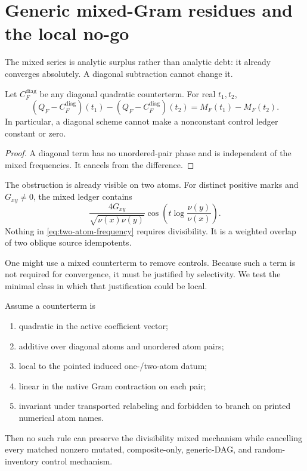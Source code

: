 \section{Generic mixed-Gram residues and the local no-go}
\label{sec:no-go}

The mixed series is analytic surplus rather than analytic debt: it already
converges absolutely.  A diagonal subtraction cannot change it.

\begin{theorem}
\label{thm:diagonal-invariance}
Let $C_F^{\mathrm{diag}}$ be any diagonal quadratic counterterm.  For real
$t_1,t_2$,
\begin{equation}
 (Q_F-C_F^{\mathrm{diag}})(t_1)
 -(Q_F-C_F^{\mathrm{diag}})(t_2)
 =M_F(t_1)-M_F(t_2).
 \label{eq:diagonal-invariance}
\end{equation}
In particular, a diagonal scheme cannot make a nonconstant control ledger
constant or zero.
\end{theorem}
\begin{proof}
A diagonal term has no unordered-pair phase and is independent of the mixed
frequencies.  It cancels from the difference.
\end{proof}

The obstruction is already visible on two atoms.  For distinct positive
marks and $G_{xy}\ne0$, the mixed ledger contains
\begin{equation}
 \frac{4G_{xy}}{\sqrt{\nu(x)\nu(y)}}
 \cos\!\left(t\log\frac{\nu(y)}{\nu(x)}\right).
 \label{eq:two-atom-frequency}
\end{equation}
Nothing in \eqref{eq:two-atom-frequency} requires divisibility.  It is a
weighted overlap of two oblique source idempotents.

One might use a mixed counterterm to remove controls.  Because such a term is
not required for convergence, it must be justified by selectivity.  We test
the minimal class in which that justification could be local.

\begin{theorem}
\label{thm:pair-local-no-go}
Assume a counterterm is
\begin{enumerate}
\item quadratic in the active coefficient vector;
\item additive over diagonal atoms and unordered atom pairs;
\item local to the pointed induced one-/two-atom datum;
\item linear in the native Gram contraction on each pair;
\item invariant under transported relabeling and forbidden to branch on
printed numerical atom names.
\end{enumerate}
Then no such rule can preserve the divisibility mixed mechanism while
cancelling every matched nonzero mutated, composite-only, generic-DAG, and
random-inventory control mechanism.
\end{theorem}

